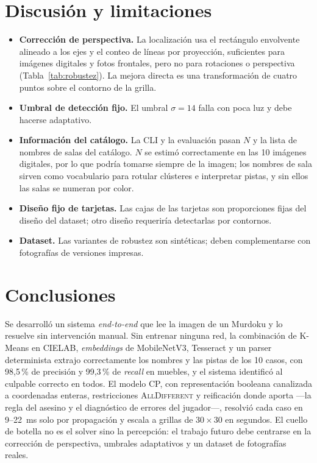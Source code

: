 \documentclass[conference,a4paper]{IEEEtran}
\newcommand{\AllDiff}{\textsc{AllDifferent}}
\begin{document}
\section{Discusión y limitaciones}

\begin{itemize}
  \item \textbf{Corrección de perspectiva.} La localización usa el rectángulo envolvente
        alineado a los ejes y el conteo de líneas por proyección, suficientes para imágenes
        digitales y fotos frontales, pero no para rotaciones o perspectiva
        (Tabla~\ref{tab:robustez}). La mejora directa es una transformación de cuatro puntos
        sobre el contorno de la grilla.
  \item \textbf{Umbral de detección fijo.} El umbral $\sigma=14$ falla con poca luz y debe
        hacerse adaptativo.
  \item \textbf{Información del catálogo.} La CLI y la evaluación pasan $N$ y la lista de
        nombres de salas del catálogo. $N$ se estimó correctamente en las 10 imágenes
        digitales, por lo que podría tomarse siempre de la imagen; los nombres de sala sirven
        como vocabulario para rotular clústeres e interpretar pistas, y sin ellos las salas
        se numeran por color.
  \item \textbf{Diseño fijo de tarjetas.} Las cajas de las tarjetas son proporciones fijas
        del diseño del dataset; otro diseño requeriría detectarlas por contornos.
  \item \textbf{Dataset.} Las variantes de robustez son sintéticas; deben complementarse con
        fotografías de versiones impresas.
\end{itemize}

\section{Conclusiones}

Se desarrolló un sistema \emph{end-to-end} que lee la imagen de un Murdoku y lo resuelve
sin intervención manual. Sin entrenar ninguna red, la combinación de K-Means en CIELAB,
\emph{embeddings} de MobileNetV3, Tesseract y un parser determinista extrajo correctamente
los nombres y las pistas de los 10 casos, con 98,5\,\% de precisión y 99,3\,\% de
\emph{recall} en muebles, y el sistema identificó al culpable correcto en todos. El modelo
CP, con representación booleana canalizada a coordenadas enteras, restricciones \AllDiff{}
y reificación donde aporta ---la regla del asesino y el diagnóstico de errores del
jugador---, resolvió cada caso en 9--22~ms solo por propagación y escala a grillas de
$30\times30$ en segundos. El cuello de botella no es el solver sino la percepción: el
trabajo futuro debe centrarse en la corrección de perspectiva, umbrales adaptativos y un
dataset de fotografías reales.
\end{document}
